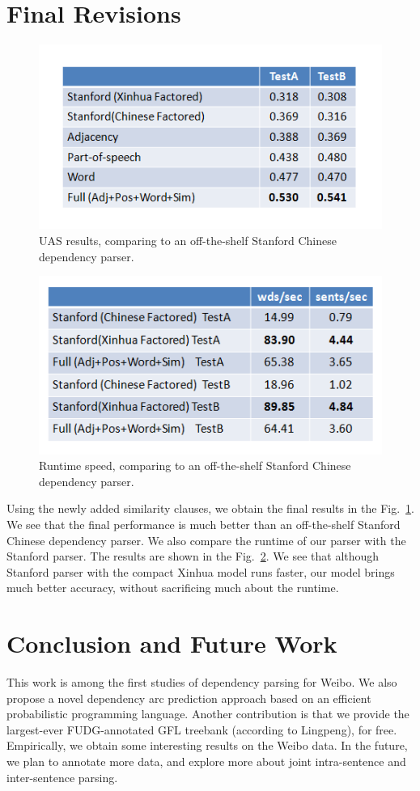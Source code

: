 \documentclass[11pt,letterpaper]{article}
\begin{document}
\section{Final Revisions}
\begin{figure}[t]
\centerline{\includegraphics[scale=1]{uas.png}}
\caption{UAS results, comparing to an off-the-shelf Stanford Chinese dependency parser.}
\label{fig:uas}
\end{figure}
\begin{figure}[t]
\centerline{\includegraphics[scale=1]{speed.png}}
\caption{Runtime speed, comparing to an off-the-shelf Stanford Chinese dependency parser.}
\label{fig:speed}
\end{figure}
Using the newly added similarity clauses, we obtain the final results in the Fig.~\ref{fig:uas}.
We see that the final performance is much better than an off-the-shelf Stanford Chinese
dependency parser. We also compare the runtime of our parser with the Stanford parser.
The results are shown in the Fig.~\ref{fig:speed}.
We see that although Stanford parser with the compact Xinhua model runs faster,
our model brings much better accuracy, without sacrificing much about the runtime.

\section{Conclusion and Future Work}
This work is among the first studies of dependency parsing for Weibo.
We also propose a novel dependency arc prediction approach based on an efficient probabilistic programming language.
Another contribution is that we provide the largest-ever FUDG-annotated GFL treebank (according to Lingpeng), for free.
Empirically, we obtain some interesting results on the Weibo data.
In the future, we plan to annotate more data, and explore more about joint intra-sentence and inter-sentence parsing.




\label{lastpage}
\end{document}
